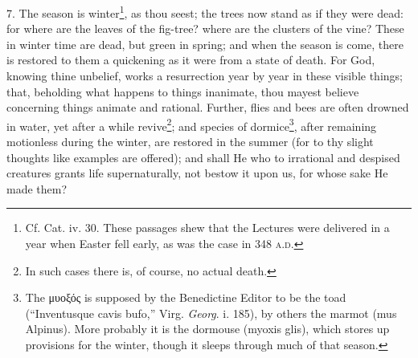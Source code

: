 7. The season is winter\footnote{Cf. Cat. iv. 30. These passages shew that the Lectures were delivered in a year when Easter fell early, as was the case in 348 \textsc{a.d.}}, as thou seest; the trees now stand as if they were dead: for where are the leaves of the fig-tree? where are the clusters of the vine? These in winter time are dead, but green in spring; and when the season is come, there is restored to them a quickening as it were from a state of death. For God, knowing thine unbelief, works a resurrection year by year in these visible things; that, beholding what happens to things inanimate, thou mayest believe concerning things animate and rational. Further, flies and bees are often drowned in water, yet after a while revive\footnote{In such cases there is, of course, no actual death.}; and species of dormice\footnote{The \textgreek{μυοξός} is supposed by the Benedictine Editor to be the toad (“Inventusque cavis bufo,” Virg. \emph{Georg}. i. 185), by others the marmot (mus Alpinus). More probably it is the dormouse (myoxis glis), which stores up provisions for the winter, though it sleeps through much of that season.}, after remaining motionless during the winter, are restored in the summer (for to thy slight thoughts like examples are offered); and shall He who to irrational and despised creatures grants life supernaturally, not bestow it upon us, for whose sake He made them?

